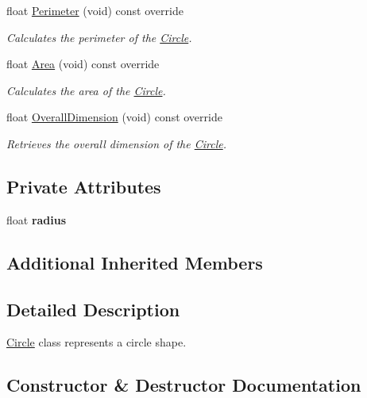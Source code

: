 \begin{DoxyCompactItemize}
float \mbox{\hyperlink{class_circle_acbb15d0cc28936ddd847802d81ba95c7}{Perimeter}} (void) const override
\begin{DoxyCompactList}\small\item\em Calculates the perimeter of the \mbox{\hyperlink{class_circle}{Circle}}. \end{DoxyCompactList}\item 
float \mbox{\hyperlink{class_circle_ae720283333ec4b0336f3ad6ff8bf20ce}{Area}} (void) const override
\begin{DoxyCompactList}\small\item\em Calculates the area of the \mbox{\hyperlink{class_circle}{Circle}}. \end{DoxyCompactList}\item 
float \mbox{\hyperlink{class_circle_a078579746ec5d8443219f0fa2ce6373e}{Overall\+Dimension}} (void) const override
\begin{DoxyCompactList}\small\item\em Retrieves the overall dimension of the \mbox{\hyperlink{class_circle}{Circle}}. \end{DoxyCompactList}\end{DoxyCompactItemize}
\subsection*{Private Attributes}
\begin{DoxyCompactItemize}
\item 
\mbox{\label{class_circle_a47644132ec8bec0f3a4e8d0e15bcd5d3}} 
float {\bfseries radius}
\end{DoxyCompactItemize}
\subsection*{Additional Inherited Members}


\subsection{Detailed Description}
\mbox{\hyperlink{class_circle}{Circle}} class represents a circle shape. 



\subsection{Constructor \& Destructor Documentation}
\mbox{\label{class_circle_ad9d167363a32bc8b1232ec7615a34c6e}} 
